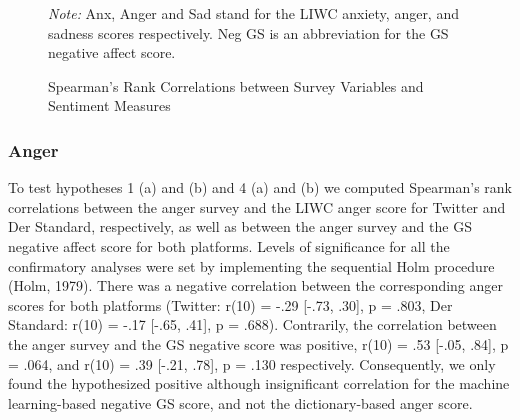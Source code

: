 \documentclass[
  english,
  jou,floatsintext]{apa7}
\begin{document}
\begin{figure}
\caption{Spearman's Rank Correlations between Survey Variables and Sentiment Measures \label{fig:survey-plot-6}}

\textit{Note:} Anx, Anger and Sad stand for the LIWC anxiety, anger, and sadness scores respectively. Neg GS is an abbreviation for the GS negative affect score.
\end{figure}

\hypertarget{anger}{%
\subsubsection{Anger}\label{anger}}

To test hypotheses 1 (a) and (b) and 4 (a) and (b) we computed Spearman's rank correlations between the anger survey and the LIWC anger score for Twitter and Der Standard, respectively, as well as between the anger survey and the GS negative affect score for both platforms. Levels of significance for all the confirmatory analyses were set by implementing the sequential Holm procedure (Holm, 1979). There was a negative correlation between the corresponding anger scores for both platforms (Twitter: r(10) = -.29 {[}-.73, .30{]}, p = .803, Der Standard: r(10) = -.17 {[}-.65, .41{]}, p = .688). Contrarily, the correlation between the anger survey and the GS negative score was positive, r(10) = .53 {[}-.05, .84{]}, p = .064, and r(10) = .39 {[}-.21, .78{]}, p = .130 respectively. Consequently, we only found the hypothesized positive although insignificant correlation for the machine learning-based negative GS score, and not the dictionary-based anger score.
\end{document}
